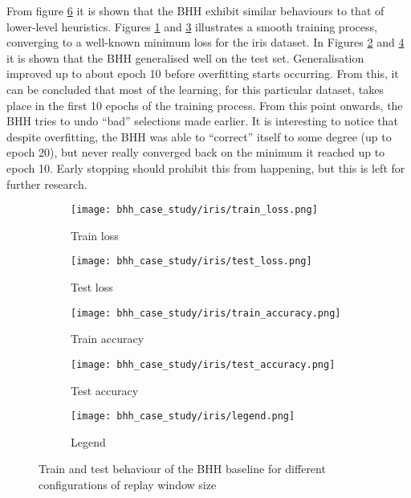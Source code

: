 From figure \ref{fig:results:case_study:iris:metric_plots} it is shown that the \Acs{BHH} exhibit similar behaviours to that of lower-level heuristics. Figures \ref{fig:results:case_study:iris:train:loss} and \ref{fig:results:case_study:iris:train:accuracy} illustrates a smooth training process, converging to a well-known minimum loss for the iris dataset. In Figures \ref{fig:results:case_study:iris:test:loss} and \ref{fig:results:case_study:iris:test:accuracy} it is shown that the \Acs{BHH} generalised well on the test set. Generalisation improved up to about epoch 10 before overfitting starts occurring. From this, it can be concluded that most of the learning, for this particular dataset, takes place in the first 10 epochs of the training process. From this point onwards, the \Acs{BHH} tries to undo ``bad'' selections made earlier. It is interesting to notice that despite overfitting, the \Acs{BHH} was able to ``correct'' itself to some degree (up to epoch 20), but never really converged back on the minimum it reached up to epoch 10. Early stopping should prohibit this from happening, but this is left for further research.

\begin{figure}[htbp]
      \begin{subfigure}{0.49\textwidth}
            \centering
            \texttt{[image: bhh\_case\_study/iris/train\_loss.png]}
            \caption{Train loss}
            \label{fig:results:case_study:iris:train:loss}
      \end{subfigure}
      \begin{subfigure}{0.49\textwidth}
            \centering
            \texttt{[image: bhh\_case\_study/iris/test\_loss.png]}
            \caption{Test loss}
            \label{fig:results:case_study:iris:test:loss}
      \end{subfigure}
      \par\bigskip
      \begin{subfigure}{0.49\textwidth}
            \centering
            \texttt{[image: bhh\_case\_study/iris/train\_accuracy.png]}
            \caption{Train accuracy}
            \label{fig:results:case_study:iris:train:accuracy}
      \end{subfigure}
      \begin{subfigure}{0.49\textwidth}
            \centering
            \texttt{[image: bhh\_case\_study/iris/test\_accuracy.png]}
            \caption{Test accuracy}
            \label{fig:results:case_study:iris:test:accuracy}
      \end{subfigure}
      \par\bigskip
      \begin{subfigure}{\textwidth}
            \centering
            \texttt{[image: bhh\_case\_study/iris/legend.png]}
            \caption{Legend}
            \label{fig:results:case_study:iris:legend}
      \end{subfigure}
      \par\bigskip
      \caption{Train and test behaviour of the \Ac{BHH} baseline for different configurations of replay window size}
      \label{fig:results:case_study:iris:metric_plots}
\end{figure}

